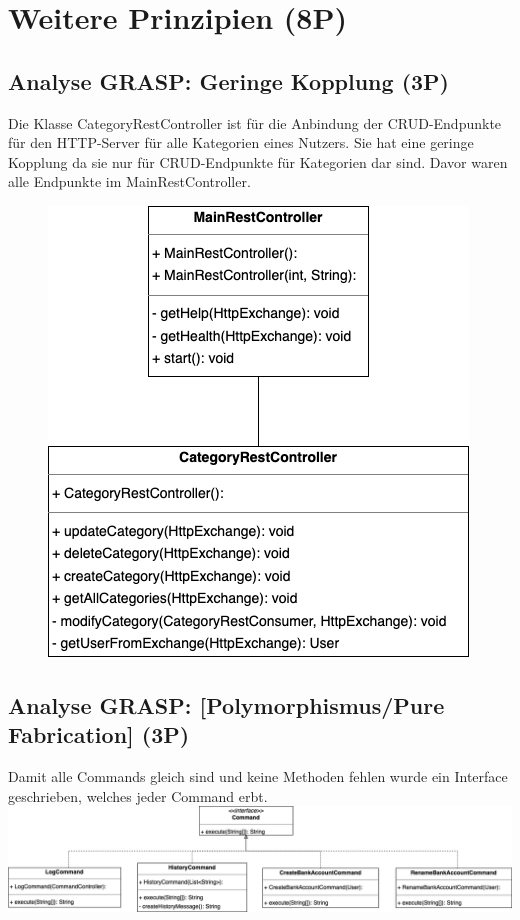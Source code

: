 \section{Weitere Prinzipien (8P)}
\subsection{Analyse GRASP: Geringe Kopplung (3P)}
Die Klasse CategoryRestController ist für die Anbindung der CRUD-Endpunkte für den HTTP-Server für alle Kategorien eines Nutzers. Sie hat eine geringe Kopplung da sie nur für CRUD-Endpunkte für Kategorien dar sind. Davor waren alle Endpunkte im MainRestController. 
\newline\newline
\begin{figure}[htbp]
    \centering
    \includegraphics[width=0.75\linewidth]
    {kapitel4_other_principals/grasp.png}
\end{figure}

\subsection{Analyse GRASP: [Polymorphismus/Pure Fabrication] (3P)}
Damit alle Commands gleich sind und keine Methoden fehlen wurde ein Interface geschrieben, welches jeder Command erbt.  
\newline\newline
\includegraphics[width=\linewidth]{kapitel4_other_principals/grasp_poly.png}
